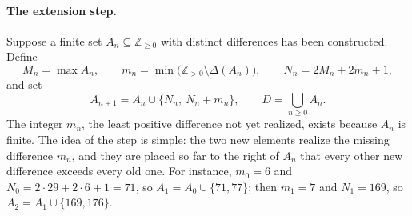 \documentclass[11pt]{article}
\theoremstyle{plain}
\theoremstyle{definition}
\newcommand{\Z}{\mathbb{Z}}
\begin{document}
\paragraph{The extension step.}
Suppose a finite set $A_n\subseteq\Z_{\geq0}$ with distinct differences
has been constructed.  Define
\begin{equation}\label{eq:parameters}
 M_n=\max A_n,\qquad
 m_n=\min\bigl(\Z_{>0}\setminus\Delta(A_n)\bigr),\qquad
 N_n=2M_n+2m_n+1,
\end{equation}
and set
\begin{equation}\label{eq:recursion}
 A_{n+1}=A_n\cup\{N_n,\ N_n+m_n\},\qquad
 D=\bigcup_{n\geq0}A_n.
\end{equation}
The integer $m_n$, the least positive difference not yet realized,
exists because $A_n$ is finite.  The idea of the step is simple: the two
new elements realize the missing difference $m_n$, and they are placed
so far to the right of $A_n$ that every other new difference exceeds
every old one.  For instance, $m_0=6$ and $N_0=2\cdot29+2\cdot6+1=71$,
so $A_1=A_0\cup\{71,77\}$; then $m_1=7$ and $N_1=169$, so
$A_2=A_1\cup\{169,176\}$.
\end{document}
